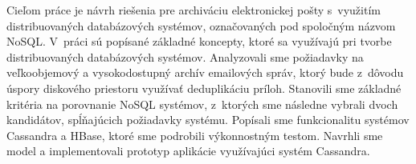 \documentclass[11pt,twoside,a4paper]{book}
\begin{document}

\baselineskip

\noindent
Cieľom práce je návrh riešenia pre archiváciu elektronickej pošty s~využitím distribuovaných databázových systémov, označovaných pod spoločným názvom NoSQL. V~práci sú popísané základné koncepty, ktoré sa využívajú pri tvorbe distribuovaných databázových systémov. Analyzovali sme požiadavky na veľkoobjemový a vysokodostupný archív emailových správ, ktorý bude z~dôvodu úspory diskového priestoru využívať deduplikáciu príloh. Stanovili sme základné kritéria na porovnanie NoSQL systémov, z~ktorých sme následne vybrali dvoch kandidátov, spĺňajúcich požiadavky systému. Popísali sme funkcionalitu systémov Cassandra a HBase, ktoré sme podrobili výkonnostným testom. Navrhli sme model a implementovali prototyp aplikácie využívajúci systém Cassandra. 



\end{document}
